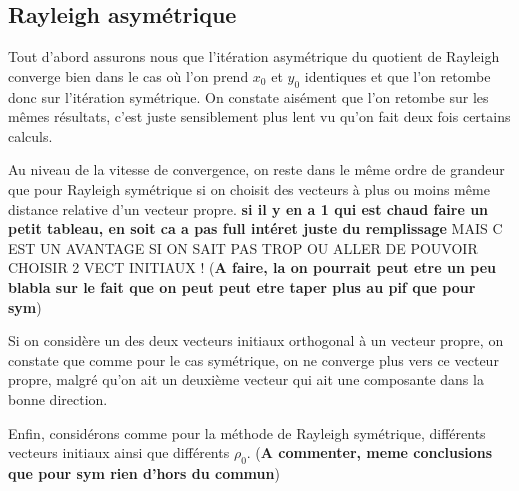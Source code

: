 
\subsection*{Rayleigh asymétrique}

	Tout d'abord assurons nous que l'itération asymétrique du quotient de Rayleigh converge bien dans le cas où l'on prend $x_0$ et $y_0$ identiques et que l'on retombe donc sur l'itération symétrique. On constate aisément que l'on retombe sur les mêmes résultats, c'est juste sensiblement plus lent vu qu'on fait deux fois certains calculs. 
	
	Au niveau de la vitesse de convergence, on reste dans le même ordre de grandeur que pour Rayleigh symétrique si on choisit des vecteurs à plus ou moins même distance relative d'un vecteur propre. \textbf{si il y en a 1 qui est chaud faire un petit tableau, en soit ca a pas full intéret juste du remplissage }
	MAIS C EST UN AVANTAGE SI ON  SAIT PAS TROP OU ALLER DE POUVOIR CHOISIR 2 VECT INITIAUX ! (\textbf{A faire, la on pourrait peut etre un peu blabla sur le fait que on peut peut etre taper plus au pif que pour sym})
	
	Si on considère un des deux vecteurs initiaux orthogonal à un vecteur propre, on constate que comme pour le cas symétrique, on ne converge plus vers ce vecteur propre, malgré qu'on ait un deuxième vecteur qui ait une composante dans la bonne direction.   
	
	
	Enfin, considérons comme pour la méthode de Rayleigh symétrique, différents vecteurs initiaux ainsi que différents $\rho_0$. (\textbf{A commenter, meme conclusions que pour sym rien d'hors du commun})
	
	
	
